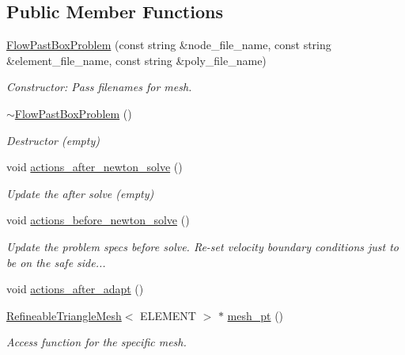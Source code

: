 \subsection*{Public Member Functions}
\begin{DoxyCompactItemize}
\item 
\hyperlink{classFlowPastBoxProblem_a6b674c1028abcd6e54c50d939d25a00e}{Flow\+Past\+Box\+Problem} (const string \&node\+\_\+file\+\_\+name, const string \&element\+\_\+file\+\_\+name, const string \&poly\+\_\+file\+\_\+name)
\begin{DoxyCompactList}\small\item\em Constructor\+: Pass filenames for mesh. \end{DoxyCompactList}\item 
\hyperlink{classFlowPastBoxProblem_a48bb150799924e3d0ab42a610babefbd}{$\sim$\+Flow\+Past\+Box\+Problem} ()
\begin{DoxyCompactList}\small\item\em Destructor (empty) \end{DoxyCompactList}\item 
void \hyperlink{classFlowPastBoxProblem_a5d226368814cfbf84f274a63b3c0b20c}{actions\+\_\+after\+\_\+newton\+\_\+solve} ()
\begin{DoxyCompactList}\small\item\em Update the after solve (empty) \end{DoxyCompactList}\item 
void \hyperlink{classFlowPastBoxProblem_a602772b5e37d5bd426d64e46cc3f59ea}{actions\+\_\+before\+\_\+newton\+\_\+solve} ()
\begin{DoxyCompactList}\small\item\em Update the problem specs before solve. Re-\/set velocity boundary conditions just to be on the safe side... \end{DoxyCompactList}\item 
void \hyperlink{classFlowPastBoxProblem_a726b784a8c4c4cbfff1a870ed9d01d28}{actions\+\_\+after\+\_\+adapt} ()
\item 
\hyperlink{classoomph_1_1RefineableTriangleMesh}{Refineable\+Triangle\+Mesh}$<$ E\+L\+E\+M\+E\+NT $>$ $\ast$ \hyperlink{classFlowPastBoxProblem_a61a6212a46def12d33d68453489f4379}{mesh\+\_\+pt} ()
\begin{DoxyCompactList}\small\item\em Access function for the specific mesh. \end{DoxyCompactList}\item 

\end{DoxyCompactItemize}
